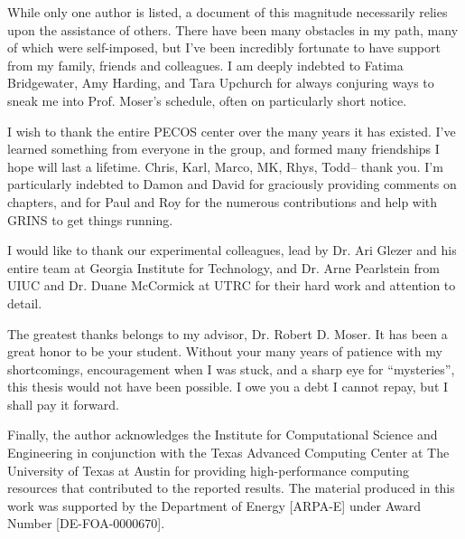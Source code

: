 %

While only one author is listed, a document of this magnitude
necessarily relies upon the assistance of others. There have
been many obstacles in my path, many of which were self-imposed, but
I've been incredibly fortunate to have support from my family, friends
and colleagues. 
%
%
I am deeply indebted to Fatima Bridgewater, Amy Harding, and Tara
Upchurch for always conjuring ways to sneak me into Prof. Moser's
schedule, often on particularly short notice. 

%
%
I wish to thank the entire PECOS center over the many years it has
existed. I've learned something from everyone in the group, and formed
many friendships I hope will last a lifetime. Chris, Karl, Marco, MK,
Rhys, Todd-- thank you. I'm particularly indebted to Damon and
David for graciously providing comments on chapters, and for 
Paul and Roy for the numerous contributions and help with GRINS 
to get things running.

%
%
I would like to thank our experimental colleagues, lead by Dr\@. Ari
Glezer and his  
entire team at Georgia Institute for Technology, and Dr\@. Arne
Pearlstein from UIUC and Dr\@. Duane McCormick at UTRC for their hard
work and attention to detail. 

%
%
The greatest thanks belongs to my advisor, Dr. Robert D. Moser. 
It has been a great honor to be your student. 
Without your many years of patience with my shortcomings, 
encouragement when I was stuck, and a sharp eye for ``mysteries'',
this thesis would not have been possible. 
I owe you a debt I cannot repay, but I shall pay it forward. 

%
%
%


Finally, the author acknowledges the Institute for Computational Science
and Engineering in conjunction with the Texas Advanced Computing Center
at The University of Texas at Austin for providing high-performance
computing resources that contributed to the reported results.
The material produced in this work was supported by the Department of
Energy [ARPA-E] under Award Number [DE-FOA-0000670].

